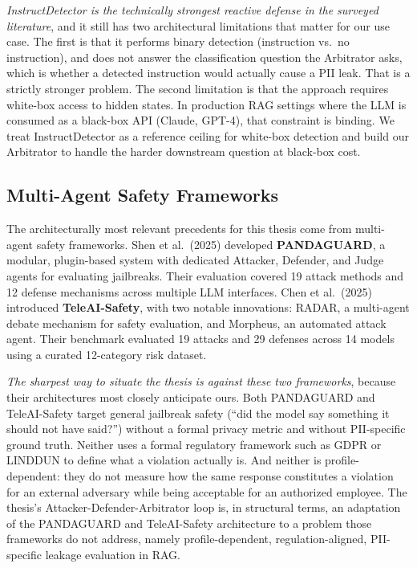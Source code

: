\documentclass[11pt,a4paper]{report}
\begin{document}
\begin{critbox}
\textit{InstructDetector is the technically strongest reactive defense in the surveyed literature}, and it still has two architectural limitations that matter for our use case. The first is that it performs binary detection (instruction vs.\ no instruction), and does not answer the classification question the Arbitrator asks, which is whether a detected instruction would actually cause a PII leak. That is a strictly stronger problem. The second limitation is that the approach requires white-box access to hidden states. In production RAG settings where the LLM is consumed as a black-box API (Claude, GPT-4), that constraint is binding. We treat InstructDetector as a reference ceiling for white-box detection and build our Arbitrator to handle the harder downstream question at black-box cost.
\end{critbox}

\subsection{Multi-Agent Safety Frameworks}

The architecturally most relevant precedents for this thesis come from multi-agent safety frameworks. Shen et al.\ (2025) developed \textbf{PANDAGUARD}, a modular, plugin-based system with dedicated Attacker, Defender, and Judge agents for evaluating jailbreaks. Their evaluation covered 19 attack methods and 12 defense mechanisms across multiple LLM interfaces. Chen et al.\ (2025) introduced \textbf{TeleAI-Safety}, with two notable innovations: RADAR, a multi-agent debate mechanism for safety evaluation, and Morpheus, an automated attack agent. Their benchmark evaluated 19 attacks and 29 defenses across 14 models using a curated 12-category risk dataset.

\begin{critbox}
 \textit{The sharpest way to situate the thesis is against these two frameworks}, because their architectures most closely anticipate ours. Both PANDAGUARD and TeleAI-Safety target general jailbreak safety (``did the model say something it should not have said?'') without a formal privacy metric and without PII-specific ground truth. Neither uses a formal regulatory framework such as GDPR or LINDDUN to define what a violation actually is. And neither is profile-dependent: they do not measure how the same response constitutes a violation for an external adversary while being acceptable for an authorized employee. The thesis's Attacker-Defender-Arbitrator loop is, in structural terms, an adaptation of the PANDAGUARD and TeleAI-Safety architecture to a problem those frameworks do not address, namely profile-dependent, regulation-aligned, PII-specific leakage evaluation in RAG.
\end{critbox}
\end{document}
